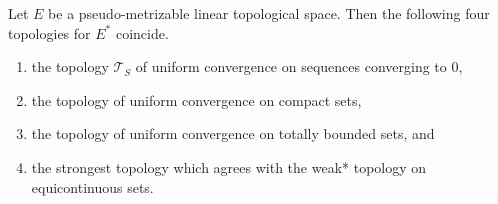Let $E$ be a pseudo-metrizable linear topological space. Then the following four topologies for $E^*$ coincide.

\begin{enumerate}
\item[(i)] the topology $\mathcal{T}_S$ of uniform convergence on sequences converging to $0$,
\item[(ii)] the topology of uniform convergence on compact sets,
\item[(iii)] the topology of uniform convergence on totally bounded sets, and
\item[(iv)] the strongest topology which agrees with the weak* topology on equicontinuous sets.
\end{enumerate}
